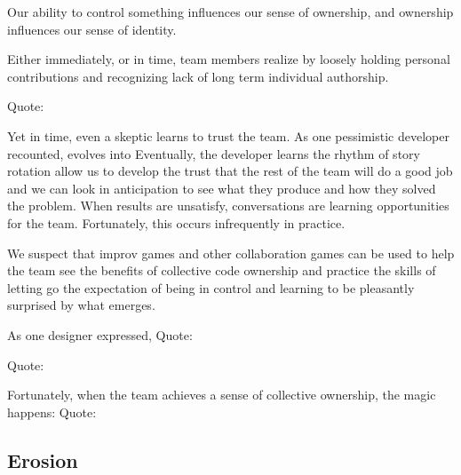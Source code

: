 Our ability to control something influences our sense of ownership, and ownership influences our sense of identity. 

Either immediately, or in time, team members realize  by loosely holding personal contributions and recognizing lack of long term individual authorship.

Quote: 

Yet in time, even a skeptic learns to trust the team.  As one pessimistic developer recounted,  evolves into  Eventually, the developer learns the rhythm of story rotation allow us to develop the trust that the rest of the team will do a good job and we can look in anticipation to see what they produce and how they solved the problem. When results are unsatisfy, conversations are learning opportunities for the team. Fortunately, this occurs infrequently in practice. 

We suspect that improv games and other collaboration games can be used to help the team see the benefits of collective code ownership and practice the skills of letting go the expectation of being in control and learning to be pleasantly surprised by what emerges.

As one designer expressed, Quote: 

Quote: 

Fortunately, when the team achieves a sense of collective ownership, the magic happens: Quote: 

\subsection{Erosion}
